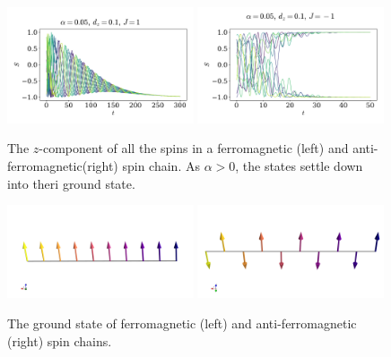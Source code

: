 \documentclass{article}
\begin{document}
    \begin{figure}[H]
        \centering
        \includegraphics[width=0.49\textwidth]{../plots/ground_state_f.pdf}
        \includegraphics[width=0.49\textwidth]{../plots/ground_state_af.pdf}
        \caption{The $z$-component of all the spins in a ferromagnetic (left) and anti-ferromagnetic(right) spin chain. As $\alpha>0$, the states settle down into theri ground state.}
        \label{ground states}
    \end{figure}
    \begin{figure}[H]
        \centering
        \includegraphics[width=0.49\textwidth]{../plots/ground_state_f3D.png}
        \includegraphics[width=0.49\textwidth]{../plots/ground_state_af3D.png}
        \caption{The ground state of ferromagnetic (left) and anti-ferromagnetic (right) spin chains.}
        \label{ground states 3D}
    \end{figure}
\end{document}
